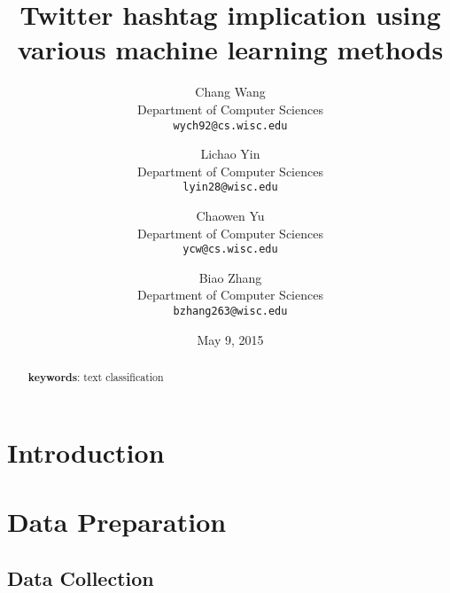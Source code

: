 \documentclass[letterpaper,11pt,twocolumn]{article}
\title{\bf{Twitter hashtag implication using various machine learning methods}}
\author{
  Chang Wang\\
  Department of Computer Sciences\\
  \texttt{wych92@cs.wisc.edu}
  \and
  Lichao Yin\\
  Department of Computer Sciences\\
  \texttt{lyin28@wisc.edu}
  \and
  Chaowen Yu\\
  Department of Computer Sciences\\
  \texttt{ycw@cs.wisc.edu}
  \and
  Biao Zhang\\
  Department of Computer Sciences\\
  \texttt{bzhang263@wisc.edu}
}
\date{May 9, 2015}
\begin{document}
\twocolumn[
\maketitle
]
\begin{abstract}
\textbf{keywords}: text classification
\end{abstract}


\section{Introduction}
\label{sec:intro}



\section{Data Preparation}
\label{sec:data}
\subsection{Data Collection}
\end{document}
